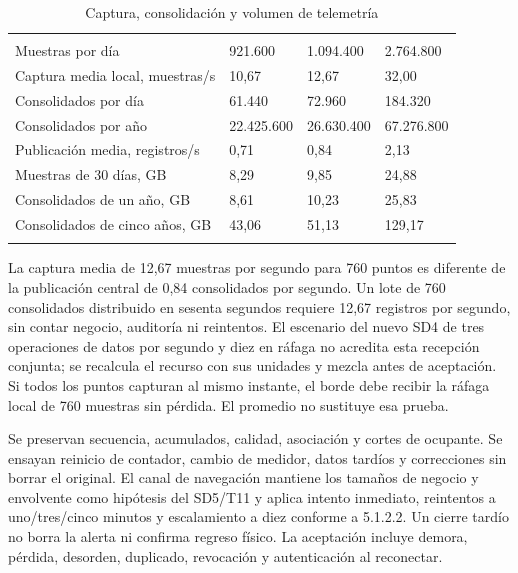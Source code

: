 \begingroup
\setlength{\tabcolsep}{3pt}
\begin{longtable}{@{}L{.40\textwidth}L{.20\textwidth}L{.20\textwidth}L{\dimexpr.20\textwidth-18pt\relax}@{}}
\caption{Captura, consolidación y volumen de telemetría}\label{tab:sd5_volumen_telemetria}\\
\hline
{} &  &  &  \\ \hline
\endfirsthead
\hline
{} &  &  &  \\ \hline
\endhead
Muestras por día & 921.600 & 1.094.400 & 2.764.800 \\ \addlinespace \hline
Captura media local, muestras/s & 10,67 & 12,67 & 32,00 \\ \addlinespace \hline
Consolidados por día & 61.440 & 72.960 & 184.320 \\ \addlinespace \hline
Consolidados por año & 22.425.600 & 26.630.400 & 67.276.800 \\ \addlinespace \hline
Publicación media, registros/s & 0,71 & 0,84 & 2,13 \\ \addlinespace \hline
Muestras de 30 días, GB & 8,29 & 9,85 & 24,88 \\ \addlinespace \hline
Consolidados de un año, GB & 8,61 & 10,23 & 25,83 \\ \addlinespace \hline
Consolidados de cinco años, GB & 43,06 & 51,13 & 129,17 \\ \addlinespace \hline
\end{longtable}
\endgroup

La captura media de 12,67 muestras por segundo para 760 puntos es diferente de la publicación central de 0,84 consolidados por segundo. Un lote de 760 consolidados distribuido en sesenta segundos requiere 12,67 registros por segundo, sin contar negocio, auditoría ni reintentos. El escenario del nuevo SD4 de tres operaciones de datos por segundo y diez en ráfaga no acredita esta recepción conjunta; se recalcula el recurso con sus unidades y mezcla antes de aceptación. Si todos los puntos capturan al mismo instante, el borde debe recibir la ráfaga local de 760 muestras sin pérdida. El promedio no sustituye esa prueba.

Se preservan secuencia, acumulados, calidad, asociación y cortes de ocupante. Se ensayan reinicio de contador, cambio de medidor, datos tardíos y correcciones sin borrar el original. El canal de navegación mantiene los tamaños de negocio y envolvente como hipótesis del SD5/T11 y aplica intento inmediato, reintentos a uno/tres/cinco minutos y escalamiento a diez conforme a 5.1.2.2. Un cierre tardío no borra la alerta ni confirma regreso físico. La aceptación incluye demora, pérdida, desorden, duplicado, revocación y autenticación al reconectar.

